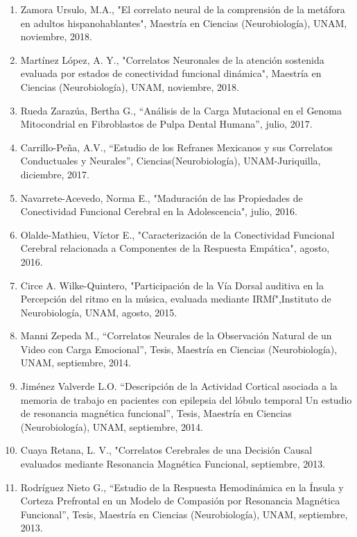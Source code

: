 \begin{enumerate}
\item Zamora Ursulo, M.A., "El correlato neural de la comprensión de la metáfora en adultos hispanohablantes", Maestría en Ciencias (Neurobiología), UNAM,   
noviembre, 2018.

\item Martínez López, A. Y., "Correlatos Neuronales de la atención sostenida evaluada por estados de conectividad funcional dinámica", Maestría en Ciencias 
(Neurobiología), UNAM, noviembre, 2018.

\item Rueda Zarazúa, Bertha G., “Análisis de la Carga Mutacional en el Genoma Mitocondrial en Fibroblastos de Pulpa Dental Humana”, julio, 2017.

\item Carrillo-Peña, A.V., “Estudio de los Refranes Mexicanos y sus Correlatos Conductuales y Neurales”, Ciencias(Neurobiología), UNAM-Juriquilla, 
diciembre, 2017.

\item Navarrete-Acevedo, Norma E., "Maduración de las Propiedades de Conectividad Funcional Cerebral en la Adolescencia", julio, 2016.

\item Olalde-Mathieu, Víctor E., "Caracterización de la Conectividad Funcional Cerebral relacionada a Componentes de la Respuesta Empática", agosto, 2016.

\item Circe A. Wilke-Quintero, "Participación de la Vía Dorsal auditiva en la Percepción del ritmo en la música, evaluada mediante IRMf",Instituto de 
Neurobiología, UNAM, agosto, 2015.

\item Manni Zepeda M., “Correlatos Neurales de la Observación Natural de un Video con Carga Emocional”, Tesis, Maestría en Ciencias (Neurobiología), UNAM,   
septiembre, 2014.

\item Jiménez Valverde L.O. “Descripción de la Actividad Cortical asociada a la memoria de trabajo en pacientes con epilepsia del lóbulo temporal Un estudio 
de 
resonancia magnética funcional”, Tesis, Maestría en Ciencias (Neurobiología), UNAM, septiembre, 2014.

\item Cuaya Retana, L. V., "Correlatos Cerebrales de una Decisión Causal evaluados mediante Resonancia Magnética Funcional, septiembre, 2013.

\item Rodríguez Nieto G., “Estudio de la Respuesta Hemodinámica en la Ínsula y Corteza Prefrontal en un Modelo de Compasión por Resonancia Magnética 
Funcional”, 
Tesis, Maestría en Ciencias (Neurobiología), UNAM, septiembre, 2013.


\end{enumerate}
